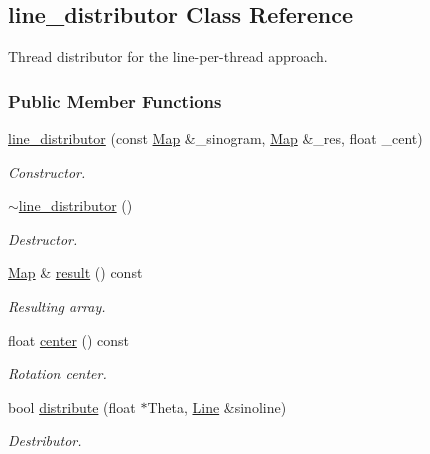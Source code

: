 \hypertarget{classline__distributor}{
\subsection{line\_\-distributor Class Reference}
\label{classline__distributor}
}


Thread distributor for the line-\/per-\/thread approach.  


\subsubsection*{Public Member Functions}
\begin{DoxyCompactItemize}
\item 
\hyperlink{classline__distributor_a81b53d1b8c9584fab472268fe4f5993d}{line\_\-distributor} (const \hyperlink{group__Types_ga8747378c016fc11d9ecbb98787248c25}{Map} \&\_\-sinogram, \hyperlink{group__Types_ga8747378c016fc11d9ecbb98787248c25}{Map} \&\_\-res, float \_\-cent)
\begin{DoxyCompactList}\small\item\em Constructor. \item\end{DoxyCompactList}\item 
\hyperlink{classline__distributor_a6baddc3dcca534d85aec0187012d92df}{$\sim$line\_\-distributor} ()
\begin{DoxyCompactList}\small\item\em Destructor. \item\end{DoxyCompactList}\item 
\hyperlink{group__Types_ga8747378c016fc11d9ecbb98787248c25}{Map} \& \hyperlink{classline__distributor_a78dd5cc707064ab1a0008844fe5b1df8}{result} () const 
\begin{DoxyCompactList}\small\item\em Resulting array. \item\end{DoxyCompactList}\item 
float \hyperlink{classline__distributor_a03e1b624d71913435f4f632592cf302b}{center} () const 
\begin{DoxyCompactList}\small\item\em Rotation center. \item\end{DoxyCompactList}\item 
bool \hyperlink{classline__distributor_a0589f25603c6575dfe0d9804c4f84643}{distribute} (float $\ast$Theta, \hyperlink{group__Types_ga4ce3fdeba27702c8b09a141e22709e38}{Line} \&sinoline)
\begin{DoxyCompactList}\small\item\em Destributor. \item\end{DoxyCompactList}\end{DoxyCompactItemize}
